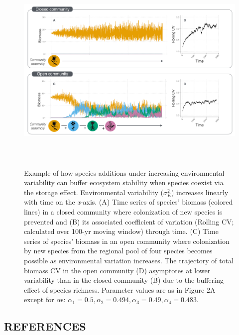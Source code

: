 \documentclass[12pt,]{article}
\begin{document}
\begin{figure}[!ht]
  \centering
      \includegraphics[height=4in]{./components/coexistence_stability_infographic_v2.png}
  \caption{Example of how species additions under increasing environmental variability can buffer ecosystem stability when species coexist via the storage effect. Environmental variability ($\sigma^2_E$) increases linearly with time on the \emph{x}-axis. (A) Time series of species' biomass (colored lines) in a closed community where colonization of new species is prevented and (B) its associated coefficient of variation (Rolling CV; calculated over 100-yr moving window) through time. (C) Time series of species' biomass in an open community where colonization by new species from the regional pool of four species becomes possible as environmental variation increases. The trajectory of total biomass CV in the open community (D) asymptotes at lower variability than in the closed community (B) due to the buffering effect of species richness. Parameter values are as in Figure 2A except for $\alpha$s: $\alpha_1 = 0.5, \alpha_2 = 0.494, \alpha_3 = 0.49, \alpha_4 = 0.483$.}
\end{figure}

\newpage{}

\setlength{\parindent}{0ex} \singlespacing

\subsection*{REFERENCES}\label{references}
\end{document}
